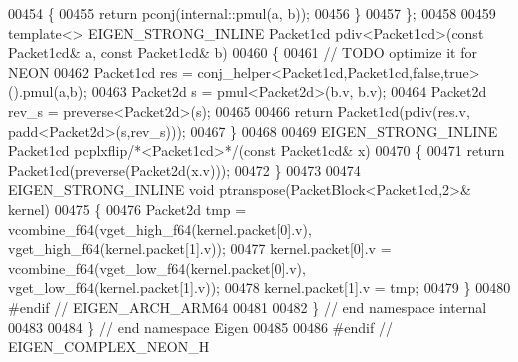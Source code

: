 \begin{DoxyCode}
00454 \textcolor{keyword}{  }\{
00455     \textcolor{keywordflow}{return} pconj(internal::pmul(a, b));
00456   \}
00457 \};
00458 
00459 \textcolor{keyword}{template}<> EIGEN\_STRONG\_INLINE Packet1cd pdiv<Packet1cd>(\textcolor{keyword}{const} Packet1cd& a, \textcolor{keyword}{const} Packet1cd& b)
00460 \{
00461   \textcolor{comment}{// TODO optimize it for NEON}
00462   Packet1cd res = conj\_helper<Packet1cd,Packet1cd,false,true>().pmul(a,b);
00463   Packet2d s = pmul<Packet2d>(b.v, b.v);
00464   Packet2d rev\_s = preverse<Packet2d>(s);
00465 
00466   \textcolor{keywordflow}{return} Packet1cd(pdiv(res.v, padd<Packet2d>(s,rev\_s)));
00467 \}
00468 
00469 EIGEN\_STRONG\_INLINE Packet1cd pcplxflip\textcolor{comment}{/*<Packet1cd>*/}(\textcolor{keyword}{const} Packet1cd& x)
00470 \{
00471   \textcolor{keywordflow}{return} Packet1cd(preverse(Packet2d(x.v)));
00472 \}
00473 
00474 EIGEN\_STRONG\_INLINE \textcolor{keywordtype}{void} ptranspose(PacketBlock<Packet1cd,2>& kernel)
00475 \{
00476   Packet2d tmp = vcombine\_f64(vget\_high\_f64(kernel.packet[0].v), vget\_high\_f64(kernel.packet[1].v));
00477   kernel.packet[0].v = vcombine\_f64(vget\_low\_f64(kernel.packet[0].v), vget\_low\_f64(kernel.packet[1].v));
00478   kernel.packet[1].v = tmp;
00479 \}
00480 \textcolor{preprocessor}{#endif // EIGEN\_ARCH\_ARM64}
00481 
00482 \} \textcolor{comment}{// end namespace internal}
00483 
00484 \} \textcolor{comment}{// end namespace Eigen}
00485 
00486 \textcolor{preprocessor}{#endif // EIGEN\_COMPLEX\_NEON\_H}
\end{DoxyCode}
